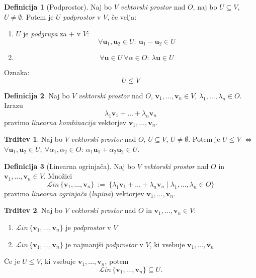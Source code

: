 \documentclass[11pt]{article}
\renewcommand{\u}{\mathbf{u}}
\newcommand{\vv}{\mathbf{v}}
\newcommand{\0}{\mathbf{0}}
\newcommand{\Lin}{\mathcal{L}\textit{in}\,}
\theoremstyle{definition}
\newtheorem{definicija}{Definicija}[section]
\theoremstyle{definition}
\newtheorem{trditev}{Trditev}[section]
\theoremstyle{definition}
\theoremstyle{definition}
\begin{document}
\begin{definicija}[Podprostor]

Naj bo $V$ \textit{vektorski prostor} nad $O$, naj bo $U \subseteq V$, $U \neq \emptyset$. Potem je $U$ \textit{podprostor} v $V$, če velja:
\begin{enumerate}
	\item $U$ je \textit{podgrupa} za $+$ v $V$:
	$$\forall \u_1, \u_2 \in U: ~\u_1 - \u_2 \in U$$
	\item $$\forall \u \in U ~\forall \alpha \in O: ~\lambda\u \in U$$
\end{enumerate}
Oznaka:$$U \leq V$$

\end{definicija}
\vspace{0.5cm}

\begin{definicija}

Naj bo $V$ \textit{vektorski prostor} nad $O$, $\vv_1,\ldots,\vv_n \in V$, \hbox{$\lambda_1,\ldots,\lambda_n \in O$.} Izrazu 
$$\lambda_1 \vv_1 + \ldots + \lambda_n \vv_n$$
pravimo \textit{linearna kombinacija} vektorjev $\vv_1,\ldots,\vv_n$.

\end{definicija}
\vspace{0.5cm}

\begin{trditev}

Naj bo $V$ \textit{vektorski prostor} nad $O$, $U \subseteq V$, $U \neq \emptyset$. Potem je $U \leq V$ $\iff$ $\forall \u_1, \u_2 \in U, ~\forall\alpha_1, \alpha_2 \in O: ~\alpha_1 \u_1 + \alpha_2 \u_2 \in U$.

\end{trditev}
\vspace{0.5cm}

\begin{definicija}[Linearna ogrinjača]

Naj bo $V$ \textit{vektorski prostor} nad $O$ in $\vv_1,\ldots,\vv_n \in V$. Množici
$$\Lin\{\vv_1,\ldots,\vv_n\} ~:=~ \{\lambda_1\vv_1 + \ldots + \lambda_n\vv_n \mid \lambda_1,\ldots,\lambda_n \in O\}$$
pravimo \textit{linearna ogrinjača} (\textit{lupina}) vektorjev $\vv_1,\ldots,\vv_n$.

\end{definicija}
\vspace{0.5cm}

\begin{trditev}

Naj bo $V$ \textit{vektorski prostor} nad $O$ in $\vv_1,\ldots,\vv_n \in V$:
\begin{enumerate}
	\item $\Lin\{\vv_1,\ldots,\vv_n\}$ je \textit{podprostor} v $V$
	\item $\Lin\{\vv_1,\ldots,\vv_n\}$ je najmanjši \textit{podprostor} v $V$, ki vsebuje $\vv_1,\ldots,\vv_n$
\end{enumerate} 
Če je $U \leq V$, ki vsebuje $\vv_1,\ldots,\vv_n$, potem 
$$\Lin\{\vv_1,\ldots,\vv_n\} \subseteq U.$$

\end{trditev}
\vspace{0.5cm}
\end{document}
